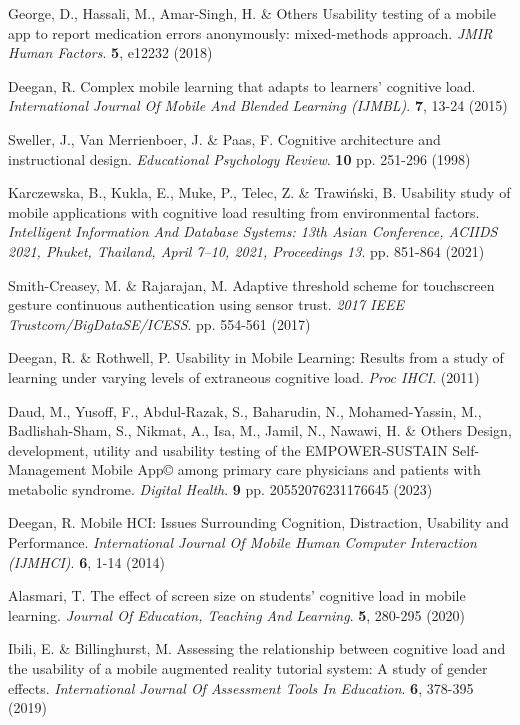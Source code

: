 \documentclass[preprint,12pt]{elsarticle}
\begin{document}
\begin{thebibliography}{99}
George, D., Hassali, M., Amar-Singh, H. \& Others Usability testing of a mobile app to report medication errors anonymously: mixed-methods approach. {\em JMIR Human Factors}. \textbf{5}, e12232 (2018)

Deegan, R. Complex mobile learning that adapts to learners' cognitive load. {\em International Journal Of Mobile And Blended Learning (IJMBL)}. \textbf{7}, 13-24 (2015)

Sweller, J., Van Merrienboer, J. \& Paas, F. Cognitive architecture and instructional design. {\em Educational Psychology Review}. \textbf{10} pp. 251-296 (1998)

Karczewska, B., Kukla, E., Muke, P., Telec, Z. \& Trawiński, B. Usability study of mobile applications with cognitive load resulting from environmental factors. {\em Intelligent Information And Database Systems: 13th Asian Conference, ACIIDS 2021, Phuket, Thailand, April 7–10, 2021, Proceedings 13}. pp. 851-864 (2021)

Smith-Creasey, M. \& Rajarajan, M. Adaptive threshold scheme for touchscreen gesture continuous authentication using sensor trust. {\em 2017 IEEE Trustcom/BigDataSE/ICESS}. pp. 554-561 (2017)

Deegan, R. \& Rothwell, P. Usability in Mobile Learning: Results from a study of learning under varying levels of extraneous cognitive load. {\em Proc IHCI}. (2011)

Daud, M., Yusoff, F., Abdul-Razak, S., Baharudin, N., Mohamed-Yassin, M., Badlishah-Sham, S., Nikmat, A., Isa, M., Jamil, N., Nawawi, H. \& Others Design, development, utility and usability testing of the EMPOWER-SUSTAIN Self-Management Mobile App© among primary care physicians and patients with metabolic syndrome. {\em Digital Health}. \textbf{9} pp. 20552076231176645 (2023)

Deegan, R. Mobile HCI: Issues Surrounding Cognition, Distraction, Usability and Performance. {\em International Journal Of Mobile Human Computer Interaction (IJMHCI)}. \textbf{6}, 1-14 (2014)

Alasmari, T. The effect of screen size on students’ cognitive load in mobile learning. {\em Journal Of Education, Teaching And Learning}. \textbf{5}, 280-295 (2020)

Ibili, E. \& Billinghurst, M. Assessing the relationship between cognitive load and the usability of a mobile augmented reality tutorial system: A study of gender effects. {\em International Journal Of Assessment Tools In Education}. \textbf{6}, 378-395 (2019)


\end{thebibliography}
\end{document}
